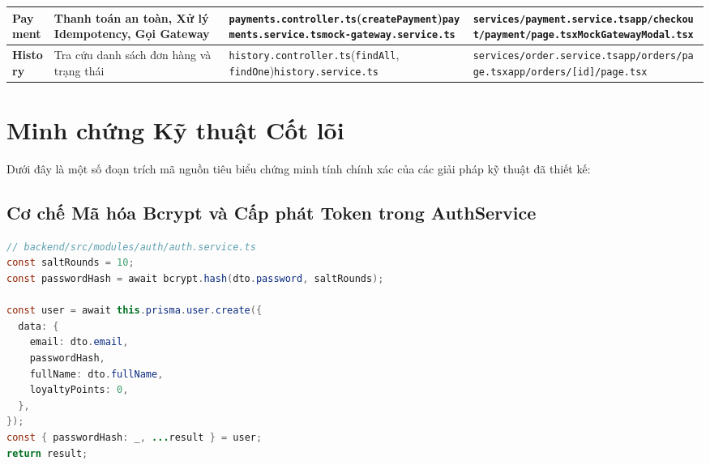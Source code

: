 \documentclass[12pt,a4paper,oneside]{report}
\begin{document}
\begin{table}[H]
\begin{tabularx}{\textwidth}{lp{3.2cm}Xp{4.3cm}}
\midrule
\textbf{Payment} & Thanh toán an toàn, Xử lý Idempotency, Gọi Gateway & \texttt{payments.controller.ts}\newline (\texttt{createPayment})\newline \texttt{payments.service.ts}\newline \texttt{mock-gateway.service.ts} & \texttt{services/payment.service.ts}\newline \texttt{app/checkout/payment/page.tsx}\newline \texttt{MockGatewayModal.tsx} \\
\midrule
\textbf{History} & Tra cứu danh sách đơn hàng và trạng thái & \texttt{history.controller.ts}\newline (\texttt{findAll}, \texttt{findOne})\newline \texttt{history.service.ts} & \texttt{services/order.service.ts}\newline \texttt{app/orders/page.tsx}\newline \texttt{app/orders/[id]/page.tsx} \\
\bottomrule
\end{tabularx}
\end{table}

\section{Minh chứng Kỹ thuật Cốt lõi}
Dưới đây là một số đoạn trích mã nguồn tiêu biểu chứng minh tính chính xác của các giải pháp kỹ thuật đã thiết kế:

\subsection{Cơ chế Mã hóa Bcrypt và Cấp phát Token trong AuthService}
\begin{lstlisting}[language=Java]
// backend/src/modules/auth/auth.service.ts
const saltRounds = 10;
const passwordHash = await bcrypt.hash(dto.password, saltRounds);

const user = await this.prisma.user.create({
  data: {
    email: dto.email,
    passwordHash,
    fullName: dto.fullName,
    loyaltyPoints: 0,
  },
});
const { passwordHash: _, ...result } = user;
return result;
\end{lstlisting}
\end{document}
